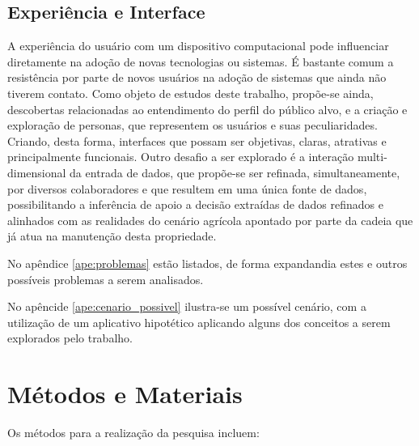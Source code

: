 \documentclass[12pt]{article}
\begin{document}
\subsection{Experiência e Interface}

A experiência do usuário com um dispositivo computacional pode influenciar diretamente na adoção de novas tecnologias ou sistemas. É bastante comum a resistência por parte de novos usuários na adoção de sistemas que ainda não tiverem contato. Como objeto de estudos deste trabalho, propõe-se ainda, descobertas relacionadas ao entendimento do perfil do público alvo, e a criação e exploração de personas, que representem os usuários e suas peculiaridades. Criando, desta forma, interfaces que possam ser objetivas, claras, atrativas e principalmente funcionais. Outro desafio a ser explorado é a interação multi-dimensional da entrada de dados, que propõe-se ser refinada, simultaneamente, por diversos colaboradores e que resultem em uma única fonte de dados, possibilitando a inferência de apoio a decisão extraídas de dados refinados e alinhados com as realidades do cenário agrícola apontado por parte da cadeia que já atua na manutenção desta propriedade.

No apêndice \ref{ape:problemas} estão listados, de forma expandandia estes e outros possíveis problemas a serem analisados.

No apêncide \ref{ape:cenario_possivel} ilustra-se um possível cenário, com a utilização de um aplicativo hipotético aplicando alguns dos conceitos a serem explorados pelo trabalho.

\section{Métodos e Materiais}
\label{sec:metodos_materiais}
		
Os métodos para a realização da pesquisa incluem:
\end{document}
